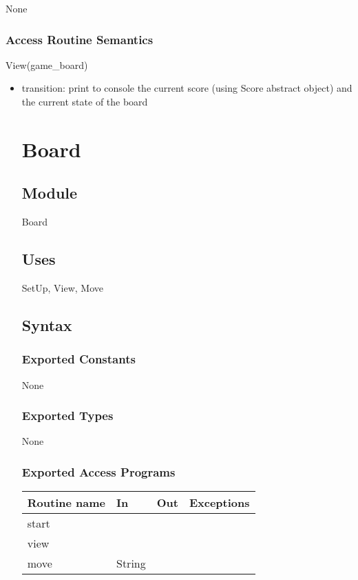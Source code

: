 \documentclass[12pt]{article}
\begin{document}
None

\subsubsection* {Access Routine Semantics}

\noindent View(game\_board)

\begin{itemize}
\item transition: print to console the current score (using Score abstract object) and the current state of the board

\newpage

\section* {Board}

\subsection*{Module}

Board

\subsection* {Uses}

SetUp, View, Move

\subsection* {Syntax}

\subsubsection* {Exported Constants}

None

\subsubsection* {Exported Types}

None

\subsubsection* {Exported Access Programs}

\begin{tabular}{| l | l | l | p{5cm} |}
  \hline
  \textbf{Routine name} & \textbf{In} & \textbf{Out} & \textbf{Exceptions}\\
  \hline
  start & & & & \\
  \hline
  view & & & \\
  \hline
  move & String & & \\
  \hline
  

\end{tabular}
\end{itemize}
\end{document}
